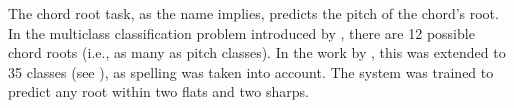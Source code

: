 
The chord root task, as the name implies, predicts the pitch
of the chord's root. In the multiclass classification
problem introduced by \textcite{chen2018functional}, there
are 12 possible chord roots (i.e., as many as pitch
classes). In the work by \textcite{micchi2020not}, this was
extended to 35 classes (see
), as spelling was taken
into account. The system was trained to predict any root
within two flats and two sharps. 
